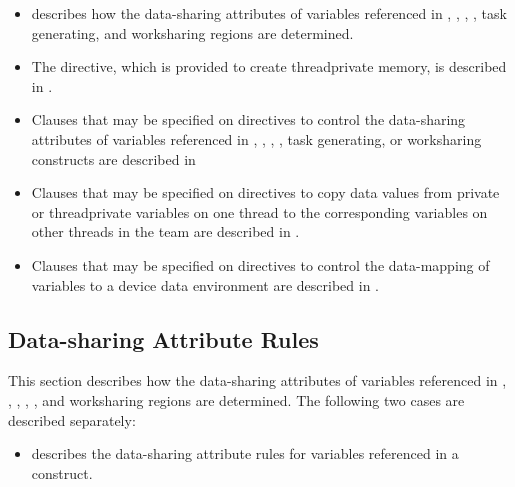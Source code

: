 {{{{\begin{itemize}
\item {} 
describes how the data-sharing attributes of variables
referenced in , , , , task generating, and worksharing regions are determined.

\item The  directive, which is provided to create threadprivate memory, 
is described in .

\item Clauses that may be specified on directives to control the data-sharing attributes of 
variables referenced in , , , , task generating, or worksharing constructs are described in 

\item Clauses that may be specified on directives to copy data values from private or 
threadprivate variables on one thread to the corresponding variables on other threads 
in the team are described in .

\item Clauses that may be specified on directives to control the data-mapping of variables to a device data environment are described in .
\end{itemize}










\subsection{Data-sharing Attribute Rules}
\label{subsec:Data-sharing Attribute Rules}
This section describes how the data-sharing attributes of variables referenced in 
, , , , , and worksharing regions are determined. The following two cases are described separately:

\begin{itemize}
\item {} 
describes the data-sharing attribute rules for variables 
referenced in a construct.


\end{itemize}}}}}
